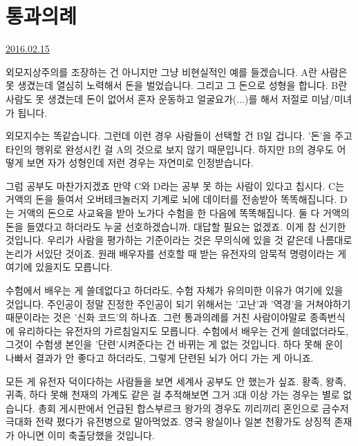 \section{통과의례}
\href{https://www.kockoc.com/Apoc/636843}{2016.02.15}

\vspace{5mm}

외모지상주의를 조장하는 건 아니지만 그냥 비현실적인 예를 들겠습니다.
A란 사람은 못 생겼는데 열심히 노력해서 돈을 벌었습니다. 그리고 그 돈으로 성형을 합니다.
B란 사람도 못 생겼는데 돈이 없어서 혼자 운동하고 얼굴요가(...)를 해서 저절로 미남/미녀가 됩니다.
\vspace{5mm}

외모지수는 똑같습니다. 그런데 이런 경우 사람들이 선택할 건 B일 겁니다.
'돈'을 주고 타인의 행위로 완성시킨 걸 A의 것으로 보지 않기 때문입니다.
하지만 B의 경우도 어떻게 보면 자가 성형인데 저런 경우는 자연미로 인정받습니다.
\vspace{5mm}

그럼 공부도 마찬가지겠죠
만약 C와 D라는 공부 못 하는 사람이 있다고 칩시다.
C는 거액의 돈을 들여서 오버테크놀러지 기계로 뇌에 데이터를 전송받아 똑똑해집니다.
D는 거액의 돈으로 사교육을 받아 노가다 수험을 한 다음에 똑똑해집니다.
둘 다 거액의 돈을 들였다고 하더라도 누굴 선호하겠습니까. 대답할 필요는 없겠죠.
이게 참 신기한 것입니다. 우리가 사람을 평가하는 기준이라는 것은 무의식에 있을 것 같은데 나름대로 논리가 서있단 것이죠.
원래 배우자를 선호할 때 받는 유전자의 암묵적 명령이라는 게 여기에 있을지도 모릅니다.
\vspace{5mm}

수험에서 배우는 게 쓸데없다고 하더라도, 수험 자체가 유의미한 이유가 여기에 있을 것입니다.
주인공이 정말 진정한 주인공이 되기 위해서는 '고난'과 '역경'을 거쳐야하기 때문이라는 것은 '신화 코드'의 하나죠.
그런 통과의례를 거친 사람이야말로 종족번식에 유리하다는 유전자의 가르침일지도 모릅니다.
수험에서 배우는 건게 쓸데없더라도, 그것이 수험생 본인을 '단련'시켜준다는 건 바뀌는 게 없는 것입니다.
하다 못해 운이 나빠서 결과가 안 좋다고 하더라도, 그렇게 단련된 뇌가 어디 가는 게 아니죠.
\vspace{5mm}

모든 게 유전자 덕이다하는 사람들을 보면 세계사 공부도 안 했는가 싶죠.
황족, 왕족, 귀족, 하다 못해 천재의 가계도 같은 걸 추적해보면 그거 3대 이상 가는 경우는 별로 없습니다.
총회 게시판에서 언급된 합스부르크 왕가의 경우도 끼리끼리 혼인으로 금수저 극대화 전략 폈다가 유전병으로 말아먹었죠.
영국 왕실이나 일본 천황가도 상징적 존재가 아니면 이미 축출당했을 것입니다.
\vspace{5mm}

